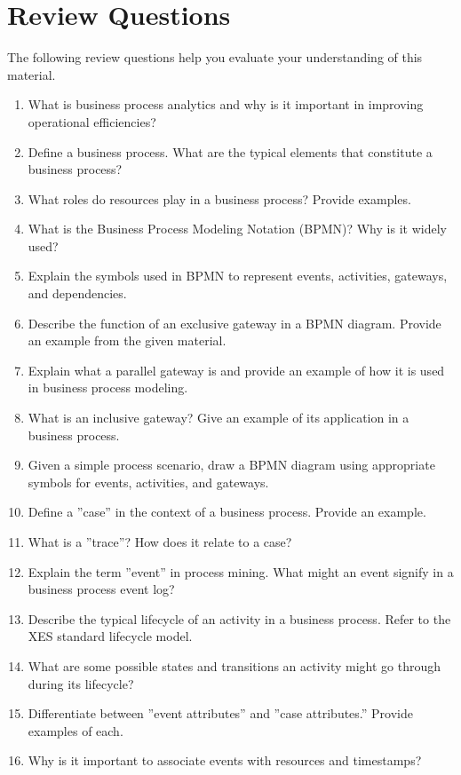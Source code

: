 \section{Review Questions}

The following review questions help you evaluate your understanding of this material.

\begin{enumerate}[nosep]
    \item What is business process analytics and why is it important in improving operational efficiencies?
    \item Define a business process. What are the typical elements that constitute a business process?
    \item What roles do resources play in a business process? Provide examples.
    \item What is the Business Process Modeling Notation (BPMN)? Why is it widely used?
    \item Explain the symbols used in BPMN to represent events, activities, gateways, and dependencies.
    \item Describe the function of an exclusive gateway in a BPMN diagram. Provide an example from the given material.
    \item Explain what a parallel gateway is and provide an example of how it is used in business process modeling.
    \item What is an inclusive gateway? Give an example of its application in a business process.
    \item Given a simple process scenario, draw a BPMN diagram using appropriate symbols for events, activities, and gateways.
    \item Define a ''case'' in the context of a business process. Provide an example.
    \item What is a ''trace''? How does it relate to a case?
    \item Explain the term ''event'' in process mining. What might an event signify in a business process event log?
    \item Describe the typical lifecycle of an activity in a business process. Refer to the XES standard lifecycle model.
    \item What are some possible states and transitions an activity might go through during its lifecycle?
    \item Differentiate between ''event attributes'' and ''case attributes.'' Provide examples of each.
    \item Why is it important to associate events with resources and timestamps?

\end{enumerate}
